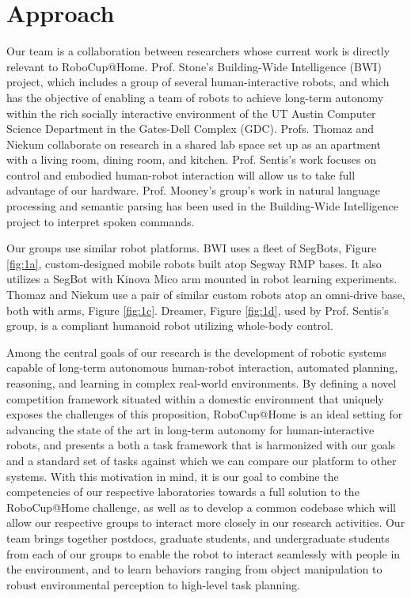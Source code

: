 \section{Approach}
Our team is a collaboration between researchers whose current work is directly relevant to RoboCup@Home. Prof. Stone's Building-Wide Intelligence (BWI) project, which includes a group of several human-interactive robots, and which has the objective of enabling a team of robots to achieve long-term autonomy within the rich socially interactive environment of the UT Austin Computer Science Department in the Gates-Dell Complex (GDC). Profs. Thomaz and Niekum collaborate on research in a shared lab space set up as an apartment with a living room, dining room, and kitchen. Prof. Sentis's work focuses on control and embodied human-robot interaction will allow us to take full advantage of our hardware. Prof. Mooney's group's work in natural language processing and semantic parsing has been used in the Building-Wide Intelligence project to interpret spoken commands.

Our groups use similar robot platforms. BWI uses a fleet of SegBots, Figure \ref{fig:1a}, custom-designed mobile robots built atop Segway RMP bases. It also utilizes a SegBot with Kinova Mico arm mounted in robot learning experiments. Thomaz and Niekum use a pair of similar custom robots atop an omni-drive base, both with arms, Figure \ref{fig:1c}. Dreamer, Figure \ref{fig:1d}, used by Prof. Sentis's group, is a compliant humanoid robot utilizing whole-body control.





Among the central goals of our research is the development of robotic systems capable of long-term autonomous human-robot interaction, automated planning, reasoning, and learning in complex real-world environments. By defining a novel competition framework situated within a domestic environment that uniquely exposes the challenges of this proposition, RoboCup@Home is an ideal setting for advancing the state of the art in long-term autonomy for human-interactive robots, and presents a both a task framework that is harmonized with our goals and a standard set of tasks against which we can compare our platform to other systems. With this motivation in mind, it is our goal to combine the competencies of our respective laboratories towards a full solution to the RoboCup@Home challenge, as well as to develop a common codebase which will allow our respective groups to interact more closely in our research activities. Our team brings together postdocs, graduate students, and undergraduate students from each of our groups to enable the robot to interact seamlessly with people in the environment, and to learn behaviors ranging from object manipulation to robust environmental perception to high-level task planning.

